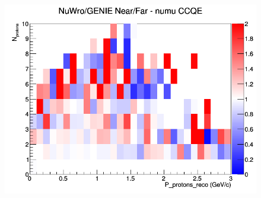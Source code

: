 \documentclass[12pt]{article}
\begin{document}
\begin{figure}[h]
\endminipage
{}
\includegraphics[width=\linewidth]{eff_N_P/LAr/protons/ratios/CCQE_NuWro_GENIE_numu_NF_N_P.png}
\endminipage
\newline
\end{figure}
\clearpage
\end{document}
